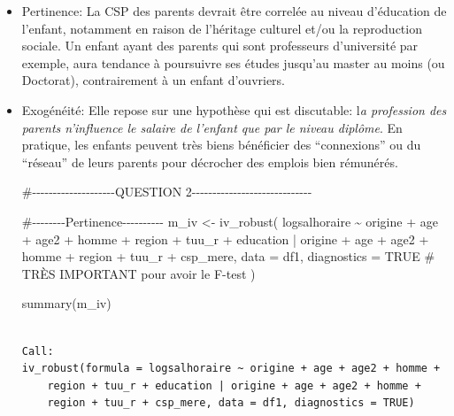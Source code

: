 \documentclass[
  letterpaper,
  DIV=11,
  numbers=noendperiod]{scrartcl}
\newenvironment{Shaded}{\begin{snugshade}}{\end{snugshade}}
\newcommand{\AttributeTok}[1]{\textcolor[rgb]{0.40,0.45,0.13}{#1}}
\newcommand{\CommentTok}[1]{\textcolor[rgb]{0.37,0.37,0.37}{#1}}
\newcommand{\ConstantTok}[1]{\textcolor[rgb]{0.56,0.35,0.01}{#1}}
\newcommand{\FunctionTok}[1]{\textcolor[rgb]{0.28,0.35,0.67}{#1}}
\newcommand{\NormalTok}[1]{\textcolor[rgb]{0.00,0.23,0.31}{#1}}
\newcommand{\OtherTok}[1]{\textcolor[rgb]{0.00,0.23,0.31}{#1}}
\newcommand{\SpecialCharTok}[1]{\textcolor[rgb]{0.37,0.37,0.37}{#1}}
\begin{document}
\begin{itemize}
\item
  Pertinence: La CSP des parents devrait être correlée au niveau
  d'éducation de l'enfant, notamment en raison de l'héritage culturel
  et/ou la reproduction sociale. Un enfant ayant des parents qui sont
  professeurs d'université par exemple, aura tendance à poursuivre ses
  études jusqu'au master au moins (ou Doctorat), contrairement à un
  enfant d'ouvriers.
\item
  Exogénéité: Elle repose sur une hypothèse qui est discutable: l\emph{a
  profession des parents n'influence le salaire de l'enfant que par le
  niveau diplôme}. En pratique, les enfants peuvent très biens
  bénéficier des ``connexions'' ou du ``réseau'' de leurs parents pour
  décrocher des emplois bien rémunérés.

\begin{Shaded}
\begin{Highlighting}[]
\CommentTok{\#{-}{-}{-}{-}{-}{-}{-}{-}{-}{-}{-}{-}{-}{-}{-}{-}{-}{-}{-}{-}QUESTION 2{-}{-}{-}{-}{-}{-}{-}{-}{-}{-}{-}{-}{-}{-}{-}{-}{-}{-}{-}{-}{-}{-}{-}{-}{-}{-}{-}{-}{-}}

          \CommentTok{\#{-}{-}{-}{-}{-}{-}{-}{-}Pertinence{-}{-}{-}{-}{-}{-}{-}{-}{-}{-}}
\NormalTok{m\_iv }\OtherTok{\textless{}{-}} \FunctionTok{iv\_robust}\NormalTok{(}
\NormalTok{  logsalhoraire }\SpecialCharTok{\textasciitilde{}}\NormalTok{ origine }\SpecialCharTok{+}\NormalTok{ age }\SpecialCharTok{+}\NormalTok{ age2 }\SpecialCharTok{+}\NormalTok{ homme }\SpecialCharTok{+}\NormalTok{ region }\SpecialCharTok{+}\NormalTok{ tuu\_r }\SpecialCharTok{+}\NormalTok{ education }\SpecialCharTok{|} 
\NormalTok{    origine }\SpecialCharTok{+}\NormalTok{ age }\SpecialCharTok{+}\NormalTok{ age2 }\SpecialCharTok{+}\NormalTok{ homme }\SpecialCharTok{+}\NormalTok{ region }\SpecialCharTok{+}\NormalTok{ tuu\_r }\SpecialCharTok{+}\NormalTok{ csp\_mere,}
  \AttributeTok{data =}\NormalTok{ df1,}
  \AttributeTok{diagnostics =} \ConstantTok{TRUE} \CommentTok{\# TRÈS IMPORTANT pour avoir le F{-}test}
\NormalTok{)}

\FunctionTok{summary}\NormalTok{(m\_iv)}
\end{Highlighting}
\end{Shaded}

\begin{verbatim}

Call:
iv_robust(formula = logsalhoraire ~ origine + age + age2 + homme + 
    region + tuu_r + education | origine + age + age2 + homme + 
    region + tuu_r + csp_mere, data = df1, diagnostics = TRUE)


\end{verbatim}
\end{itemize}
\end{document}
